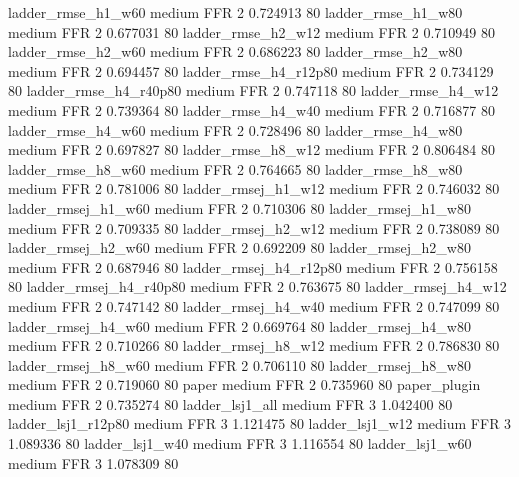     ladder_rmse_h1_w60     medium      FFR                 2 0.724913 80
    ladder_rmse_h1_w80     medium      FFR                 2 0.677031 80
    ladder_rmse_h2_w12     medium      FFR                 2 0.710949 80
    ladder_rmse_h2_w60     medium      FFR                 2 0.686223 80
    ladder_rmse_h2_w80     medium      FFR                 2 0.694457 80
 ladder_rmse_h4_r12p80     medium      FFR                 2 0.734129 80
 ladder_rmse_h4_r40p80     medium      FFR                 2 0.747118 80
    ladder_rmse_h4_w12     medium      FFR                 2 0.739364 80
    ladder_rmse_h4_w40     medium      FFR                 2 0.716877 80
    ladder_rmse_h4_w60     medium      FFR                 2 0.728496 80
    ladder_rmse_h4_w80     medium      FFR                 2 0.697827 80
    ladder_rmse_h8_w12     medium      FFR                 2 0.806484 80
    ladder_rmse_h8_w60     medium      FFR                 2 0.764665 80
    ladder_rmse_h8_w80     medium      FFR                 2 0.781006 80
   ladder_rmsej_h1_w12     medium      FFR                 2 0.746032 80
   ladder_rmsej_h1_w60     medium      FFR                 2 0.710306 80
   ladder_rmsej_h1_w80     medium      FFR                 2 0.709335 80
   ladder_rmsej_h2_w12     medium      FFR                 2 0.738089 80
   ladder_rmsej_h2_w60     medium      FFR                 2 0.692209 80
   ladder_rmsej_h2_w80     medium      FFR                 2 0.687946 80
ladder_rmsej_h4_r12p80     medium      FFR                 2 0.756158 80
ladder_rmsej_h4_r40p80     medium      FFR                 2 0.763675 80
   ladder_rmsej_h4_w12     medium      FFR                 2 0.747142 80
   ladder_rmsej_h4_w40     medium      FFR                 2 0.747099 80
   ladder_rmsej_h4_w60     medium      FFR                 2 0.669764 80
   ladder_rmsej_h4_w80     medium      FFR                 2 0.710266 80
   ladder_rmsej_h8_w12     medium      FFR                 2 0.786830 80
   ladder_rmsej_h8_w60     medium      FFR                 2 0.706110 80
   ladder_rmsej_h8_w80     medium      FFR                 2 0.719060 80
                 paper     medium      FFR                 2 0.735960 80
          paper_plugin     medium      FFR                 2 0.735274 80
       ladder_lsj1_all     medium      FFR                 3 1.042400 80
    ladder_lsj1_r12p80     medium      FFR                 3 1.121475 80
       ladder_lsj1_w12     medium      FFR                 3 1.089336 80
       ladder_lsj1_w40     medium      FFR                 3 1.116554 80
       ladder_lsj1_w60     medium      FFR                 3 1.078309 80
